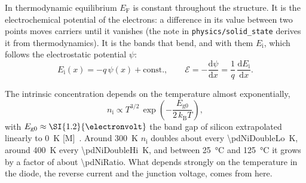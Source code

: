 \documentclass[10pt,a4paper]{scrartcl}
\newcommand{\diff}{\mathrm{d}}
\newcommand{\Ef}{\mathcal{E}}                 %
\newcommand{\nint}{n_\mathrm{i}}
\newcommand{\kB}{k_\mathrm{B}}
\begin{document}
In thermodynamic equilibrium $E_\mathrm{F}$ is constant throughout the structure. It is the electrochemical potential of the electrons: a difference in its value between two points moves carriers until it vanishes (the note in \texttt{physics/solid\_state} derives it from thermodynamics). It is the bands that bend, and with them $E_\mathrm{i}$, which follows the electrostatic potential $\psi$:
\begin{equation}
E_\mathrm{i}(x) = -q\,\psi(x) + \text{const.} , \qquad \Ef = -\frac{\diff\psi}{\diff x} = \frac{1}{q}\,\frac{\diff E_\mathrm{i}}{\diff x} .
\label{eq:potential}
\end{equation}

The intrinsic concentration depends on the temperature almost exponentially,
\begin{equation}
\nint \propto T^{3/2}\,\exp\!\left(-\frac{E_\mathrm{g0}}{2\,\kB T}\right) ,
\label{eq:ni}
\end{equation}
with $E_\mathrm{g0} \approx \SI{\pdEgZero}{\electronvolt}$ the band gap of silicon extrapolated linearly to \SI{0}{\kelvin} [M]~\cite{sze}. Around \SI{300}{\kelvin} $\nint$ doubles about every \SI{\pdNiDoubleLo}{\kelvin}, around \SI{400}{\kelvin} every \SI{\pdNiDoubleHi}{\kelvin}, and between \SI{25}{\celsius} and \SI{125}{\celsius} it grows by a factor of about \num{\pdNiRatio}. What depends strongly on the temperature in the diode, the reverse current and the junction voltage, comes from here.
\end{document}
